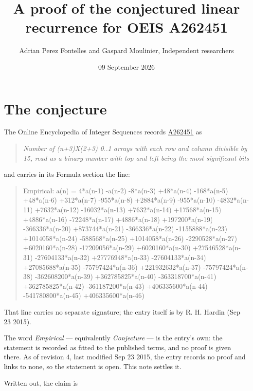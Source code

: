 \documentclass[11pt]{article}
\title{A proof of the conjectured linear recurrence for OEIS A262451}
\author{Adrian Perez Fontelles and Gaspard Moulinier, Independent researchers}
\date{09 September 2026}
\theoremstyle{definition}
\begin{document}
\maketitle
\section{The conjecture}

The Online Encyclopedia of Integer Sequences records \href{https://oeis.org/A262451}{A262451} as

\begin{quote}\itshape Number of (n+3)X(2+3) 0..1 arrays with each row and column divisible by 15, read as a binary number with top and left being the most significant bits\end{quote}

and carries in its Formula section the line:

\begin{quote}\ttfamily Empirical: a(n) = 4*a(n-1) -a(n-2) -8*a(n-3) +48*a(n-4) -168*a(n-5) +48*a(n-6) +312*a(n-7) -955*a(n-8) +2884*a(n-9) -955*a(n-10) -4832*a(n-11) +7632*a(n-12) -16032*a(n-13) +7632*a(n-14) +17568*a(n-15) +4886*a(n-16) -72248*a(n-17) +4886*a(n-18) +197200*a(n-19) -366336*a(n-20) +873744*a(n-21) -366336*a(n-22) -1155888*a(n-23) +1014058*a(n-24) -588568*a(n-25) +1014058*a(n-26) -2290528*a(n-27) +6020160*a(n-28) -17209056*a(n-29) +6020160*a(n-30) +27546528*a(n-31) -27604133*a(n-32) +27776948*a(n-33) -27604133*a(n-34) +27085688*a(n-35) -75797424*a(n-36) +221932632*a(n-37) -75797424*a(n-38) -362608200*a(n-39) +362785825*a(n-40) -363318700*a(n-41) +362785825*a(n-42) -361187200*a(n-43) +406335600*a(n-44) -541780800*a(n-45) +406335600*a(n-46)\end{quote}

That line carries no separate signature; the entry itself is by R. H. Hardin (Sep 23 2015).

The word {\itshape Empirical} --- equivalently {\itshape Conjecture} --- is the entry's own: the statement is recorded as fitted to the published terms, and no proof is given there. As of revision 4, last modified Sep 23 2015, the entry records no proof and links to none, so the statement is open. This note settles it.

Written out, the claim is
\end{document}
